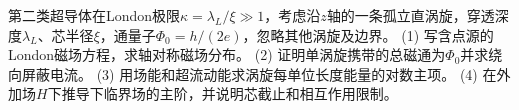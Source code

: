 第二类超导体在London极限\(\kappa=\lambda_L/\xi\gg1\)，考虑沿\(z\)轴的一条孤立直涡旋，穿透深度\(\lambda_L\)、芯半径\(\xi\)，通量子\(\Phi_0=h/(2e)\)，忽略其他涡旋及边界。
(1) 写含点源的London磁场方程，求轴对称磁场分布。
(2) 证明单涡旋携带的总磁通为\(\Phi_0\)并求绕向屏蔽电流。
(3) 用场能和超流动能求涡旋每单位长度能量的对数主项。
(4) 在外加场\(H\)下推导下临界场的主阶，并说明芯截止和相互作用限制。
